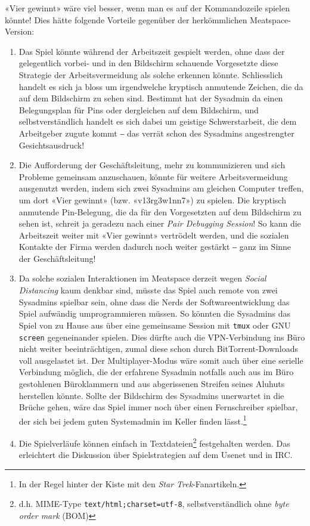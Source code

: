 \documentclass[a4paper,11pt,hidelinks]{scrartcl}
\begin{document}
«Vier gewinnt» wäre viel besser, wenn man es auf der Kommandozeile spielen könnte! Dies hätte folgende Vorteile gegenüber der herkömmlichen Meatspace-Version:

\begin{enumerate}
    \item Das Spiel könnte während der Arbeitszeit gespielt werden, ohne dass der gelegentlich vorbei- und in den Bildschirm schauende Vorgesetzte diese Strategie der Arbeitsvermeidung als solche erkennen könnte. Schliesslich handelt es sich ja bloss um irgendwelche kryptisch anmutende Zeichen, die da auf dem Bildschirm zu sehen sind. Bestimmt hat der Sysadmin da einen Belegungsplan für Pins oder dergleichen auf dem Bildschirm, und selbstverständlich handelt es sich dabei um geistige Schwerstarbeit, die dem Arbeitgeber zugute kommt ‒ das verrät schon des Sysadmins angestrengter Gesichtsausdruck!
    \item Die Aufforderung der Geschäftsleitung, mehr zu kommunizieren und sich Probleme gemeinsam anzuschauen, könnte für weitere Arbeitsvermeidung ausgenutzt werden, indem sich zwei Sysadmins am gleichen Computer treffen, um dort «Vier gewinnt» (bzw. «v13rg3w1nn7») zu spielen. Die kryptisch anmutende Pin-Be\-le\-gung, die da für den Vorgesetzten auf dem Bildschirm zu sehen ist, schreit ja geradezu nach einer \textit{Pair Debugging Session}! So kann die Arbeitszeit weiter mit «Vier gewinnt» vertrödelt werden, und die sozialen Kontakte der Firma werden dadurch noch weiter gestärkt ‒ ganz im Sinne der Geschäftsleitung!
    \item Da solche sozialen Interaktionen im Meatspace derzeit wegen \textit{Social Distancing} kaum denkbar sind, müsste das Spiel auch remote von zwei Sysadmins spielbar sein, ohne dass die Nerds der Softwareentwicklung das Spiel aufwändig umprogrammieren müssen. So könnten die Sysadmins das Spiel von zu Hause aus über eine gemeinsame Session mit \texttt{tmux} oder GNU \texttt{screen} gegeneinander spielen. Dies dürfte auch die VPN-Verbindung ins Büro nicht weiter beeinträchtigen, zumal diese schon durch BitTorrent-Downloads voll ausgelastet ist. Der Multiplayer-Modus wäre somit auch über eine serielle Verbindung möglich, die der erfahrene Sysadmin notfalls auch aus im Büro gestohlenen Büroklammern und aus abgerissenen Streifen seines Aluhuts herstellen könnte. Sollte der Bildschirm des Sysadmins unerwartet in die Brüche gehen, wäre das Spiel immer noch über einen Fernschreiber spielbar, der sich bei jedem guten Systemadmin im Keller finden lässt.\footnote{In der Regel hinter der Kiste mit den \textit{Star Trek}-Fanartikeln.}
    \item Die Spielverläufe können einfach in Textdateien\footnote{d.h. MIME-Type \texttt{text/html;charset=utf-8}, selbstverständlich ohne \textit{byte order mark} (BOM)} festgehalten werden. Das erleichtert die Diskussion über Spielstrategien auf dem Usenet und in IRC.
\end{enumerate}
\end{document}
